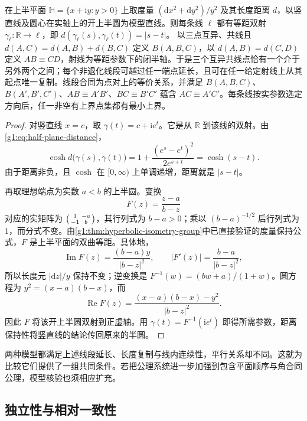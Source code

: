 \begin{proposition}
	\label{g1:prop:hyperbolic-line-parameter}
	在上半平面 \(\mathbb H=\{x+\mathrm i y:y>0\}\) 上取度量 \((\mathrm dx^2+\mathrm dy^2)/y^2\) 及其长度距离 \(d\)，以竖直线及圆心在实轴上的开上半圆为模型直线。则每条线 \(\ell\) 都有等距双射 \(\gamma_\ell:\mathbb R\to\ell\)，即 \(d(\gamma_\ell(s),\gamma_\ell(t))=|s-t|\)。
	以三点互异、共线且 \(d(A,C)=d(A,B)+d(B,C)\) 定义 \(B(A,B,C)\)，以 \(d(A,B)=d(C,D)\) 定义 \(AB\equiv CD\)，射线为等距参数下的闭半轴。于是三个互异共线点恰有一个介于另外两个之间；每个非退化线段可越过任一端点延长，且可在任一给定射线上从其起点唯一复制。线段合同为点对上的等价关系，并满足 \(B(A,B,C)\)、\(B(A',B',C')\)、\(AB\equiv A'B'\)、\(BC\equiv B'C'\) 蕴含 \(AC\equiv A'C'\)。每条线按实参数选定方向后，任一非空有上界点集都有最小上界。
\end{proposition}
\begin{proof}
	对竖直线 \(x=c\)，取 \(\gamma(t)=c+\mathrm i e^t\)。它是从 \(\mathbb R\) 到该线的双射。由\eqref{g1:eq:half-plane-distance}，
	\[
		\cosh d\bigl(\gamma(s),\gamma(t)\bigr)
		=1+\frac{(e^s-e^t)^2}{2e^{s+t}}
		=\cosh(s-t).
	\]
	由于距离非负，且 \(\cosh\) 在 \([0,\infty)\) 上单调递增，距离就是 \(|s-t|\)。

	再取理想端点为实数 \(a<b\) 的上半圆。变换
	\[
		F(z)=\frac{z-a}{b-z}
	\]
	对应的实矩阵为 \(\begin{psmallmatrix}1&-a\\-1&b\end{psmallmatrix}\)，其行列式为 \(b-a>0\)；乘以 \((b-a)^{-1/2}\) 后行列式为 \(1\)，而分式不变。由\cref{g1:thm:hyperbolic-isometry-group}中已直接验证的度量保持公式，\(F\) 是上半平面的双曲等距。具体地，
	\[
		\operatorname{Im}F(z)=\frac{(b-a)y}{|b-z|^2},\qquad
		|F'(z)|=\frac{b-a}{|b-z|^2},
	\]
	所以长度元 \(|\mathrm dz|/y\) 保持不变；逆变换是 \(F^{-1}(w)=(bw+a)/(1+w)\)。圆方程为 \(y^2=(x-a)(b-x)\)，而
	\[
		\operatorname{Re}F(z)=\frac{(x-a)(b-x)-y^2}{|b-z|^2}.
	\]
	因此 \(F\) 将该开上半圆双射到正虚轴。用 \(\gamma(t)=F^{-1}(\mathrm i e^t)\) 即得所需参数，距离保持性将竖直线的结论传回原来的半圆。
\end{proof}

两种模型都满足上述线段延长、长度复制与线内连续性，平行关系却不同。这就为比较它们提供了一组共同条件。若把公理系统进一步加强到包含平面顺序与角合同公理，模型核验也须相应扩充。

\subsection{独立性与相对一致性}
\label{g1:subsec:A01:03}

